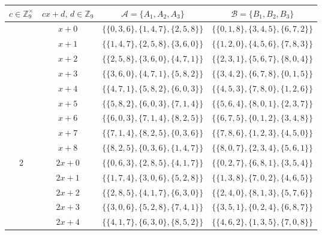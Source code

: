 \documentclass[preprint,11pt]{elsarticle}
\begin{document}
\begin{center}

\begin{longtable}{|c|c|c|c|}
\hline
$c\in \mathbb{Z}_{9}^{\times}$ & $cx+d, \, d\in \mathbb{Z}_{9}$ & $\mathcal{A}=\{A_1, A_2, A_3\}$ & $\mathcal{B}=\{B_1, B_2, B_3\}$  \\ 
\hline
\endfirsthead
\hline
\endhead
\hline
\noalign{\smallskip}
\endfoot
\endlastfoot

    \hline 
        \multirow{9}{*}{1} 
        & $x+0$ & $\{\{0,3,6\}, \{1,4,7\}, \{2,5,8\}\}$ & $\{\{0,1,8\}, \{3,4,5\}, \{6,7,2\}\}$ \\ \cline{2-4}
        & $x+1$ & $\{\{1,4,7\}, \{2,5,8\}, \{3,6,0\}\}$ & $\{\{1,2,0\}, \{4,5,6\}, \{7,8,3\}\}$ \\ \cline{2-4}
        & $x+2$ & $\{\{2,5,8\}, \{3,6,0\}, \{4,7,1\}\}$ & $\{\{2,3,1\}, \{5,6,7\}, \{8,0,4\}\}$ \\ \cline{2-4}
        & $x+3$ & $\{\{3,6,0\}, \{4,7,1\}, \{5,8,2\}\}$ & $\{\{3,4,2\}, \{6,7,8\}, \{0,1,5\}\}$ \\ \cline{2-4}
        & $x+4$ & $\{\{4,7,1\}, \{5,8,2\}, \{6,0,3\}\}$ & $\{\{4,5,3\}, \{7,8,0\}, \{1,2,6\}\}$ \\ \cline{2-4}
        & $x+5$ & $\{\{5,8,2\}, \{6,0,3\}, \{7,1,4\}\}$ & $\{\{5,6,4\}, \{8,0,1\}, \{2,3,7\}\}$ \\ \cline{2-4}
        & $x+6$ & $\{\{6,0,3\}, \{7,1,4\}, \{8,2,5\}\}$ & $\{\{6,7,5\}, \{0,1,2\}, \{3,4,8\}\}$ \\ \cline{2-4}
        & $x+7$ & $\{\{7,1,4\}, \{8,2,5\}, \{0,3,6\}\}$ & $\{\{7,8,6\}, \{1,2,3\}, \{4,5,0\}\}$ \\ \cline{2-4}
        & $x+8$ & $\{\{8,2,5\}, \{0,3,6\}, \{1,4,7\}\}$ & $\{\{8,0,7\}, \{2,3,4\}, \{5,6,1\}\}$ \\ \hline
        \hline
           \multirow{9}{*}{2} 
        & $2x+0$ & $\{\{0,6,3\}, \{2,8,5\}, \{4,1,7\}\}$ & $\{\{0,2,7\}, \{6,8,1\}, \{3,5,4\}\}$ \\ \cline{2-4} 
         & $2x+1$ & $\{\{1,7,4\}, \{3,0,6\}, \{5,2,8\}\}$ & $\{\{1,3,8\}, \{7,0,2\}, \{4,6,5\}\}$ \\ \cline{2-4}
         & $2x+2$ & $\{\{2,8,5\}, \{4,1,7\}, \{6,3,0\}\}$ & $\{\{2,4,0\}, \{8,1,3\}, \{5,7,6\}\}$ \\ \cline{2-4}
          & $2x+3$ & $\{\{3,0,6\}, \{5,2,8\}, \{7,4,1\}\}$ & $\{\{3,5,1\}, \{0,2,4\}, \{6,8,7\}\}$ \\ \cline{2-4}
          & $2x+4$ & $\{\{4,1,7\}, \{6,3,0\}, \{8,5,2\}\}$ & $\{\{4,6,2\}, \{1,3,5\}, \{7,0,8\}\}$ \\ \cline{2-4}

\end{longtable}
\end{center}
\end{document}
